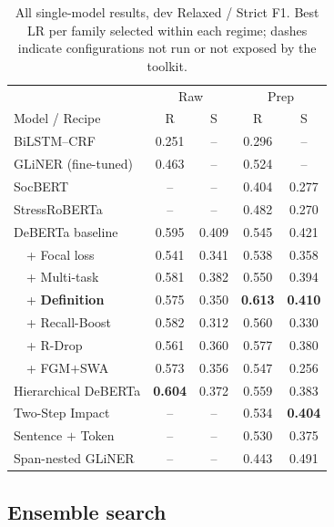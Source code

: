 \documentclass[11pt]{article}
\begin{document}
\begin{table}[t]
\centering\small
\setlength{\tabcolsep}{4pt}
\begin{tabular}{l cc cc}
\toprule
& \multicolumn{2}{c}{Raw} & \multicolumn{2}{c}{Prep} \\
Model / Recipe & R & S & R & S \\
\midrule
BiLSTM--CRF                   & 0.251 & -- & 0.296 & -- \\
GLiNER (fine-tuned)           & 0.463 & -- & 0.524 & -- \\
SocBERT                       & -- & -- & 0.404 & 0.277 \\
StressRoBERTa                 & -- & -- & 0.482 & 0.270 \\
\midrule
DeBERTa baseline              & 0.595 & 0.409 & 0.545 & 0.421 \\
\ \ + Focal loss              & 0.541 & 0.341 & 0.538 & 0.358 \\
\ \ + Multi-task              & 0.581 & 0.382 & 0.550 & 0.394 \\
\ \ + \textbf{Definition}     & 0.575 & 0.350 & \textbf{0.613} & \textbf{0.410} \\
\ \ + Recall-Boost            & 0.582 & 0.312 & 0.560 & 0.330 \\
\ \ + R-Drop                  & 0.561 & 0.360 & 0.577 & 0.380 \\
\ \ + FGM$+$SWA               & 0.573 & 0.356 & 0.547 & 0.256 \\
\midrule
Hierarchical DeBERTa          & \textbf{0.604} & 0.372 & 0.559 & 0.383 \\
Two-Step Impact               & -- & -- & 0.534 & \textbf{0.404} \\
Sentence $+$ Token            & -- & -- & 0.530 & 0.375 \\
Span-nested GLiNER            & -- & -- & 0.443 & 0.491 \\
\bottomrule
\end{tabular}
\caption{All single-model results, dev Relaxed / Strict F1. Best LR per
family selected within each regime; dashes indicate configurations not
run or not exposed by the toolkit.}
\label{tab:core}
\end{table}

\subsection{Ensemble search}
\label{sec:ensemble}
\end{document}
